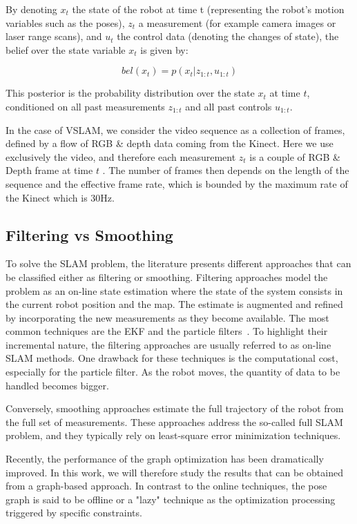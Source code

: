 By denoting $x_t$ the state of the robot at time t (representing the robot's motion variables such as the poses), $z_t$ a measurement (for example camera images or laser range scans), and $u_t$ the control data (denoting the changes of state), the belief over the state variable $x_t$ is given by:

\[bel(x_t) = p(x_t | z_{1:t}, u_{1:t})\]

This posterior is the probability distribution over the state $x_t$ at time $t$, conditioned on all past measurements $z_{1:t}$ and all past controls $u_{1:t}$.

In the case of \gls{VSLAM}, we consider the video sequence as a collection of frames, defined by a flow of RGB \& depth data coming from the Kinect. Here we use exclusively the video, and therefore each measurement $z_t$ is a couple of RGB \& Depth frame at time $t$ . The number of frames then depends on the length of the sequence and the effective frame rate, which is bounded by the maximum rate of the Kinect which is 30Hz.


\subsection{Filtering vs Smoothing}

To solve the \gls{SLAM} problem, the literature presents different approaches that can be classified either as filtering or smoothing. Filtering approaches model the problem as an on-line state estimation where the state of the system consists in the current robot position and the map. The estimate is augmented and refined by incorporating the new measurements as they become available.
The most common techniques are the \gls{EKF} and the particle filters~\cite{Thrun_2005}. To highlight their incremental nature, the filtering approaches are usually referred to as on-line \gls{SLAM} methods. One drawback for these techniques is the computational cost, especially for the particle filter. As the robot moves, the quantity of data to be handled becomes bigger.

Conversely, smoothing approaches estimate the full trajectory of the robot from the full set of measurements. These approaches address the so-called full \gls{SLAM} problem, and they typically rely on least-square error minimization techniques.

Recently, the performance of the graph optimization has been dramatically improved. In this work, we will therefore study the results that can be obtained from a graph-based approach. In contrast to the online techniques, the pose graph is said to be offline or a "lazy" technique as the optimization processing triggered by specific constraints.

